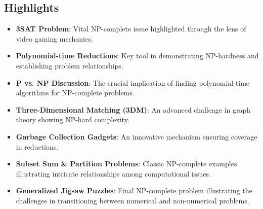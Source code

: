 \documentclass[letter, 12pt]{article}
\begin{document}
    \subsection*{Highlights}
    \begin{itemize}
        \item \textbf{3SAT Problem}: Vital NP-complete issue highlighted through the lens of video gaming mechanics.
        \item \textbf{Polynomial-time Reductions}: Key tool in demonstrating NP-hardness and establishing problem relationships.
        \item \textbf{P vs. NP Discussion}: The crucial implication of finding polynomial-time algorithms for NP-complete problems.
        \item \textbf{Three-Dimensional Matching (3DM)}: An advanced challenge in graph theory showing NP-hard complexity.
        \item \textbf{Garbage Collection Gadgets}: An innovative mechanism ensuring coverage in reductions.
        \item \textbf{Subset Sum \& Partition Problems}: Classic NP-complete examples illustrating intricate relationships among computational issues.
        \item \textbf{Generalized Jigsaw Puzzles}: Final NP-complete problem illustrating the challenges in transitioning between numerical and non-numerical problems.
    \end{itemize}
\end{document}
